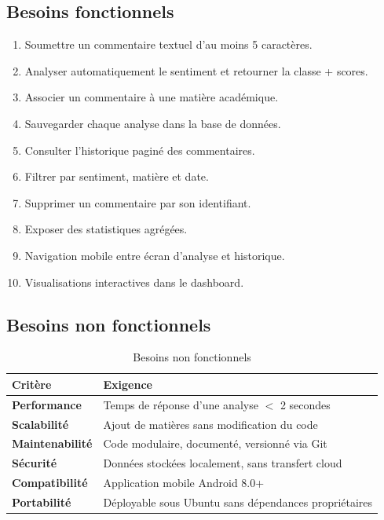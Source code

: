 \documentclass[12pt,a4paper,oneside]{report}
\begin{document}
\subsection{Besoins fonctionnels}

\begin{enumerate}[label=\textbf{BF\arabic*.},leftmargin=3em]
  \item Soumettre un commentaire textuel d'au moins 5 caractères.
  \item Analyser automatiquement le sentiment et retourner la classe + scores.
  \item Associer un commentaire à une matière académique.
  \item Sauvegarder chaque analyse dans la base de données.
  \item Consulter l'historique paginé des commentaires.
  \item Filtrer par sentiment, matière et date.
  \item Supprimer un commentaire par son identifiant.
  \item Exposer des statistiques agrégées.
  \item Navigation mobile entre écran d'analyse et historique.
  \item Visualisations interactives dans le dashboard.
\end{enumerate}

\subsection{Besoins non fonctionnels}

\begin{table}[H]
\centering
\caption{Besoins non fonctionnels}
\label{tab:bnf}
\renewcommand{\arraystretch}{1.4}
\begin{tabular}{>{\bfseries}p{2.8cm} p{10cm}}
\toprule
\rowcolor{bleuprincipal!15}
\textbf{Critère} & \textbf{Exigence} \\
\midrule
Performance & Temps de réponse d'une analyse $<$ 2 secondes \\
\rowcolor{gray!8}
Scalabilité & Ajout de matières sans modification du code \\
Maintenabilité & Code modulaire, documenté, versionné via Git \\
\rowcolor{gray!8}
Sécurité & Données stockées localement, sans transfert cloud \\
Compatibilité & Application mobile Android 8.0+ \\
\rowcolor{gray!8}
Portabilité & Déployable sous Ubuntu sans dépendances propriétaires \\
\bottomrule
\end{tabular}
\end{table}
\end{document}
